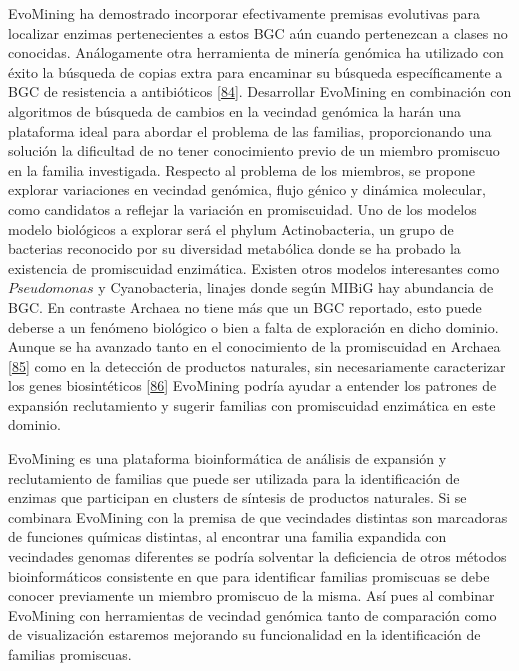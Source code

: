 \documentclass[12pt,twoside]{reedthesis}
\begin{document}
  EvoMining ha demostrado incorporar efectivamente premisas evolutivas
  para localizar enzimas pertenecientes a estos BGC aún cuando pertenezcan
  a clases no conocidas. Análogamente otra herramienta de minería genómica
  ha utilizado con éxito la búsqueda de copias extra para encaminar su
  búsqueda específicamente a BGC de resistencia a antibióticos
  {[}\protect\hyperlink{ref-alanjary_antibiotic_2017}{84}{]}. Desarrollar
  EvoMining en combinación con algoritmos de búsqueda de cambios en la
  vecindad genómica la harán una plataforma ideal para abordar el problema
  de las familias, proporcionando una solución la dificultad de no tener
  conocimiento previo de un miembro promiscuo en la familia investigada.
  Respecto al problema de los miembros, se propone explorar variaciones en
  vecindad genómica, flujo génico y dinámica molecular, como candidatos a
  reflejar la variación en promiscuidad. Uno de los modelos modelo
  biológicos a explorar será el phylum Actinobacteria, un grupo de
  bacterias reconocido por su diversidad metabólica donde se ha probado la
  existencia de promiscuidad enzimática. Existen otros modelos
  interesantes como \(Pseudomonas\) y Cyanobacteria, linajes donde según
  MIBiG hay abundancia de BGC. En contraste Archaea no tiene más que un
  BGC reportado, esto puede deberse a un fenómeno biológico o bien a falta
  de exploración en dicho dominio. Aunque se ha avanzado tanto en el
  conocimiento de la promiscuidad en Archaea
  {[}\protect\hyperlink{ref-martinez-nunez_promiscuity_Archaea_2017}{85}{]}
  como en la detección de productos naturales, sin necesariamente
  caracterizar los genes biosintéticos
  {[}\protect\hyperlink{ref-charlesworth_untapped_natural_products_Archaea_2015}{86}{]}
  EvoMining podría ayudar a entender los patrones de expansión
  reclutamiento y sugerir familias con promiscuidad enzimática en este
  dominio.
  
  EvoMining es una plataforma bioinformática de análisis de expansión y
  reclutamiento de familias que puede ser utilizada para la identificación
  de enzimas que participan en clusters de síntesis de productos
  naturales. Si se combinara EvoMining con la premisa de que vecindades
  distintas son marcadoras de funciones químicas distintas, al encontrar
  una familia expandida con vecindades genomas diferentes se podría
  solventar la deficiencia de otros métodos bioinformáticos consistente en
  que para identificar familias promiscuas se debe conocer previamente un
  miembro promiscuo de la misma. Así pues al combinar EvoMining con
  herramientas de vecindad genómica tanto de comparación como de
  visualización estaremos mejorando su funcionalidad en la identificación
  de familias promiscuas.
  
\end{document}
